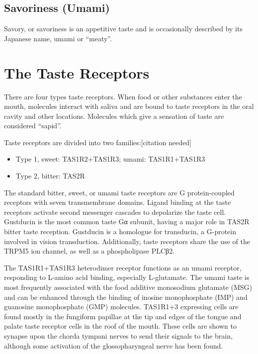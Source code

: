 \documentclass[]{book}
\providecommand{\tightlist}{%
  \setlength{\itemsep}{0pt}\setlength{\parskip}{0pt}}
\begin{document}
\hypertarget{savoriness-umami}{%
\subsection{Savoriness (Umami)}\label{savoriness-umami}}

Savory, or savoriness is an appetitive taste and is occasionally described by its Japanese name, umami or ``meaty''.

\hypertarget{the-taste-receptors}{%
\section{The Taste Receptors}\label{the-taste-receptors}}

There are four types taste receptors. When food or other substances enter the mouth, molecules interact with saliva and are bound to taste receptors in the oral cavity and other locations. Molecules which give a sensation of taste are considered ``sapid''.

Taste receptors are divided into two families:{[}citation needed{]}

\begin{itemize}
\tightlist
\item
  Type 1, sweet: TAS1R2+TAS1R3; umami: TAS1R1+TAS1R3
\item
  Type 2, bitter: TAS2R
\end{itemize}

The standard bitter, sweet, or umami taste receptors are G protein-coupled receptors with seven transmembrane domains. Ligand binding at the taste receptors activate second messenger cascades to depolarize the taste cell. Gustducin is the most common taste Gα subunit, having a major role in TAS2R bitter taste reception. Gustducin is a homologue for transducin, a G-protein involved in vision transduction. Additionally, taste receptors share the use of the TRPM5 ion channel, as well as a phospholipase PLCβ2.

The TAS1R1+TAS1R3 heterodimer receptor functions as an umami receptor, responding to L-amino acid binding, especially L-glutamate. The umami taste is most frequently associated with the food additive monosodium glutamate (MSG) and can be enhanced through the binding of inosine monophosphate (IMP) and guanosine monophosphate (GMP) molecules. TAS1R1+3 expressing cells are found mostly in the fungiform papillae at the tip and edges of the tongue and palate taste receptor cells in the roof of the mouth. These cells are shown to synapse upon the chorda tympani nerves to send their signals to the brain, although some activation of the glossopharyngeal nerve has been found.
\end{document}
